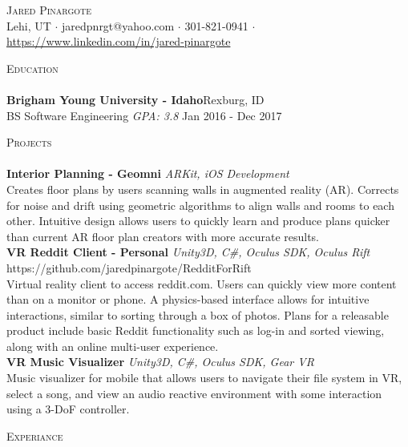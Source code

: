 \documentclass[a4paper]{article}
\newcommand{\lineunder} {
    \vspace*{-8pt} \\
    \hspace*{-18pt} \hrulefill \\
}
\newcommand{\header} [1] {
    {\hspace*{-18pt}\vspace*{6pt} \textsc{#1}}
    \vspace*{-6pt} \lineunder
}
\begin{document}
\vspace*{-40pt}

    

\vspace*{-10pt}
\begin{center}
	{\Huge \scshape {Jared Pinargote}}\\
	Lehi, UT $\cdot$ jaredpnrgt@yahoo.com $\cdot$ 301-821-0941 $\cdot$ \href{https://www.linkedin.com/in/jared-pinargote}{https://www.linkedin.com/in/jared-pinargote}
\end{center}

\header{Education}
\textbf{Brigham Young University - Idaho}\hfill Rexburg, ID\\
BS Software Engineering \textit{GPA: 3.8} \hfill Jan 2016 - Dec 2017\\
\vspace{2mm}

\header{Projects}
{\textbf{Interior Planning - Geomni}} {\sl ARKit, iOS Development} \\
Creates floor plans by users scanning walls in augmented reality (AR). Corrects for noise and drift using geometric algorithms to align walls and rooms to each other. Intuitive design allows users to quickly learn and produce plans quicker than current AR floor plan creators with more accurate results.\\
\vspace*{2mm}
{\textbf{VR Reddit Client - Personal}} {\sl Unity3D, C\#, Oculus SDK, Oculus Rift} \hfill https://github.com/jaredpinargote/RedditForRift\\
Virtual reality client to access reddit.com. Users can quickly view more content than on a monitor or phone. A physics-based interface allows for intuitive interactions, similar to sorting through a box of photos. Plans for a releasable product include basic Reddit functionality such as log-in and sorted viewing, along with an online multi-user experience.\\
\vspace*{2mm}
{\textbf{VR Music Visualizer}} {\sl Unity3D, C\#, Oculus SDK, Gear VR} \\
Music visualizer for mobile that allows users to navigate their file system in VR, select a song, and view an audio reactive environment with some interaction using a 3-DoF controller.\\
\vspace*{2mm}

\header{Experiance}
\vspace{1mm}
\end{document}
